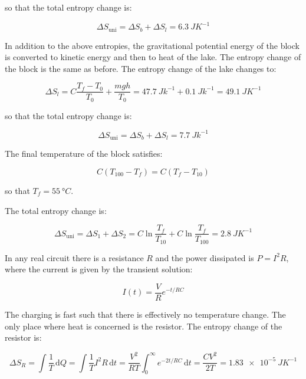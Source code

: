\documentclass[12pt]{article}
\begin{document}
so that the total entropy change is:

\begin{equation}
    \Delta S_{\text{uni}} = \Delta S_{b} + \Delta S_{l} = \qty{6.3}{JK^{-1}}
\end{equation}

In addition to the above entropies, the gravitational potential energy of the block is converted to kinetic energy and then to heat of the lake. The entropy change of the block is the same as before. The entropy change of the lake changes to:

\begin{equation}
    \Delta S_{l} =C \frac{T_{f} - T_{0}}{T_{0}} + \frac{mgh}{T_{0}} = \qty{47.7}{Jk^{-1}} + \qty{0.1}{Jk^{-1}} = \qty{49.1}{JK^{-1}}
\end{equation}

so that the total entropy change is:

\begin{equation}
    \Delta S_{\text{uni}} = \Delta S_{b} + \Delta S_{l} = \qty{7.7}{Jk^{-1}}
\end{equation}

The final temperature of the block satisfies:

\begin{equation}
    C(T_{100} - T_{f}) = C(T_{f} - T_{10})
\end{equation}

so that $T_{f} = \qty{55}{\degree C}$.

The total entropy change is:

\begin{equation}
    \Delta S_{\text{uni}} = \Delta S_{1} + \Delta S_{2} = C \ln{\frac{T_{f}}{T_{10}}} + C \ln{\frac{T_{f}}{T_{100}}} = \qty{2.8}{JK^{-1}}
\end{equation}

In any real circuit there is a resistance $R$ and the power dissipated is $P = I^{2}R$, where the current is given by the transient solution:

\begin{equation}
    I(t) = \frac{V}{R} e^{-t/RC}
\end{equation}


The charging is fast such that there is effectively no temperature change. The only place where heat is concerned is the resistor. The entropy change of the resistor is:

\begin{equation}
    \Delta S_{R} = \int \frac{1}{T} \, \mathrm{d}Q = \int \frac{1}{T} I^{2} R \, \mathrm{d}t = \frac{V^{2}}{RT} \int_{0}^{\infty} e^{-2t/RC} \, \mathrm{d}t = \frac{CV^{2}}{2T} = \qty{1.83e-5}{JK^{-1}}
\end{equation}
\end{document}
